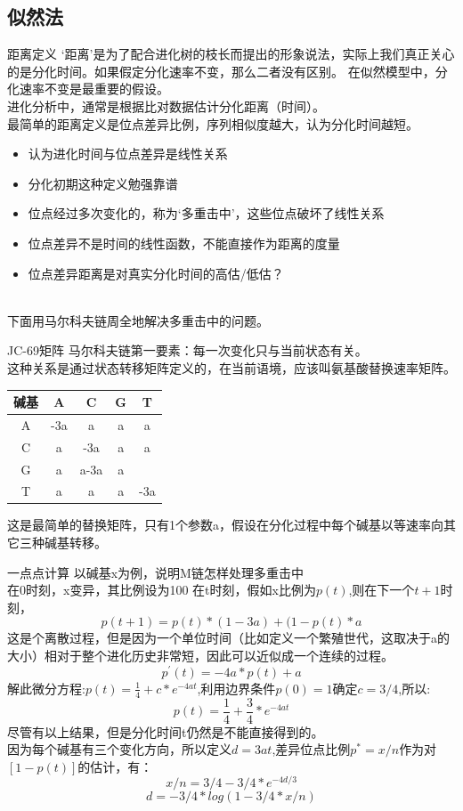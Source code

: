 \documentclass{beamer}
\begin{document}
\subsection{似然法}
\begin{frame}{距离定义}
‘距离’是为了配合进化树的枝长而提出的形象说法，实际上我们真正关心的是分化时间。如果假定分化速率不变，那么二者没有区别。
在似然模型中，{\color{red}分化速率不变}是最重要的假设。\\
进化分析中，通常是根据比对数据估计分化距离（时间）。\\								
最简单的距离定义是位点差异比例，序列相似度越大，认为分化时间越短。\\
\begin{itemize}
	\item 认为进化时间与位点差异是线性关系
	\item 分化初期这种定义勉强靠谱
	\item 位点经过多次变化的，称为‘多重击中'，这些位点破坏了线性关系
	\item 位点差异不是时间的线性函数，不能直接作为距离的度量
	\item 位点差异距离是对真实分化时间的高估/低估？
\end{itemize}	
{\color{red}{利用序列差异估计分化距离，难点是序列差异不是分化时间的线性函数，需要处理‘多重击中’}}\\
下面用马尔科夫链周全地解决多重击中的问题。								
\end{frame}
	
\begin{frame}{JC-69矩阵}
马尔科夫链第一要素：每一次变化只与当前状态有关。\\
这种关系是通过状态转移矩阵定义的，在当前语境，应该叫氨基酸替换速率矩阵。								
\begin{tabular}{c|c|c|c|c}
碱基&A&C&G&T\\
\hline
A&-3a&a&a&a\\
\hline
C&a&-3a&a&a\\
\hline
G&a&a-3a&a\\
\hline
T&a&a&a&-3a\\
\end{tabular}
这是最简单的替换矩阵，只有1个参数a，假设在分化过程中每个碱基以等速率向其它三种碱基转移。\\
\end{frame}

\begin{frame}{一点点计算}
以碱基x为例，说明M链怎样处理多重击中\\
在0时刻，x变异，其比例设为100%
在t时刻，假如x比例为$p(t)$,则在下一个$t+1$时刻，
$$p(t+1)=p(t)*(1-3a)+(1-p(t)*a$$
这是个离散过程，但是因为一个单位时间（比如定义一个繁殖世代，这取决于a的大小）相对于整个进化历史非常短，因此可以近似成一个连续的过程。
$$p^{'}(t)=-4a*p(t)+a$$
解此微分方程:$p(t)=\frac{1}{4}+c*e^{-4at}$,利用边界条件$p(0)=1$确定$c=3/4$,所以:
$$p(t)=\frac{1}{4}+\frac{3}{4}*e^{-4at}$$
尽管有以上结果，但是分化时间t仍然是不能直接得到的。\\
因为每个碱基有三个变化方向，所以{\color{red}定义$d=3at$},差异位点比例$p^{*}=x/n$作为对$[1-p(t)]$的估计，有：
$$x/n=3/4-3/4*e^{-4d/3}$$
$$d=-3/4*log(1-3/4*x/n)$$
\end{frame}
\end{document}
